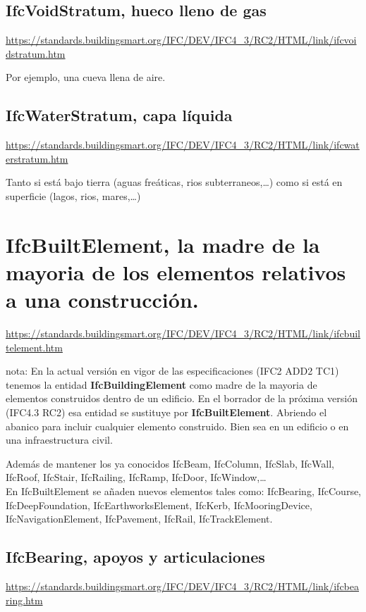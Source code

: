 \documentclass[spanish,12pt,a4paper,final,oneside]{book}
\begin{document}
\subsection{IfcVoidStratum, hueco lleno de gas}
\url{https://standards.buildingsmart.org/IFC/DEV/IFC4_3/RC2/HTML/link/ifcvoidstratum.htm}

Por ejemplo, una cueva llena de aire.

\subsection{IfcWaterStratum, capa líquida}
\url{https://standards.buildingsmart.org/IFC/DEV/IFC4_3/RC2/HTML/link/ifcwaterstratum.htm}

Tanto si está bajo tierra (aguas freáticas, rios subterraneos,\ldots) como si está en superficie (lagos, rios, mares,\ldots)



\section{IfcBuiltElement, la madre de la mayoria de los elementos relativos a una construcción.} \label{IfcBuiltElement}
\url{https://standards.buildingsmart.org/IFC/DEV/IFC4_3/RC2/HTML/link/ifcbuiltelement.htm}

nota: En la actual versión en vigor de las especificaciones (IFC2 ADD2 TC1) tenemos la entidad \textbf{IfcBuildingElement} como madre de la mayoria de elementos construidos dentro de un edificio. En el borrador de la próxima versión (IFC4.3 RC2) esa entidad se sustituye por \textbf{IfcBuiltElement}. Abriendo el abanico para incluir cualquier elemento construido. Bien sea en un edificio o en una infraestructura civil.

Además de mantener los ya conocidos IfcBeam, IfcColumn, IfcSlab, IfcWall, IfcRoof, IfcStair, IfcRailing, IfcRamp, IfcDoor, IfcWindow,\dots 
\\En IfcBuiltElement se añaden nuevos elementos tales como: IfcBearing, IfcCourse, IfcDeepFoundation, IfcEarthworksElement, IfcKerb, IfcMooringDevice, IfcNavigationElement, IfcPavement, IfcRail, IfcTrackElement. 

\subsection{IfcBearing, apoyos y articulaciones}
\url{https://standards.buildingsmart.org/IFC/DEV/IFC4_3/RC2/HTML/link/ifcbearing.htm}
\end{document}
